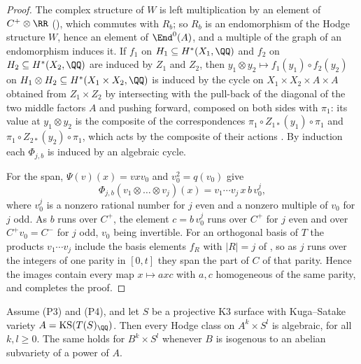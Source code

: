 \begin{proof}
The complex structure of $W$ is left multiplication by an element of
$C^{+}\otimes\RR$ (), which commutes with $R_{b}$; so $R_{b}$
is an endomorphism of the Hodge structure $W$, hence an element of
$\End^{0}(A)$, and a multiple of the graph of an endomorphism induces it.
If $f_{1}$ on $H_{1}\subseteq H^{*}(X_{1},\QQ)$ and $f_{2}$ on
$H_{2}\subseteq H^{*}(X_{2},\QQ)$ are induced by $Z_{1}$ and $Z_{2}$, then
$y_{1}\otimes y_{2}\mapsto f_{1}(y_{1})\circ f_{2}(y_{2})$ on
$H_{1}\otimes H_{2}\subseteq H^{*}(X_{1}\times X_{2},\QQ)$ is induced by the
cycle on $X_{1}\times X_{2}\times A\times A$ obtained from
$Z_{1}\times Z_{2}$ by intersecting with the pull-back of the diagonal of the
two middle factors $A$ and pushing forward, composed on both sides with
$\pi_{1}$: its value at $y_{1}\otimes y_{2}$ is the composite of the
correspondences $\pi_{1}\circ Z_{1*}(y_{1})\circ\pi_{1}$ and
$\pi_{1}\circ Z_{2*}(y_{2})\circ\pi_{1}$, which acts by the composite of their
actions \cite[\S16.1]{Ful98}. By induction each $\Phi_{j,b}$ is induced by
an algebraic cycle.

For the span, $\Psi(v)(x)=vxv_{0}$ and $v_{0}^{2}=q(v_{0})$ give
\[
  \Phi_{j,b}(v_{1}\otimes\dots\otimes v_{j})(x)=v_{1}\cdots v_{j}\,x\,b\,v_{0}^{j},
\]
where $v_{0}^{j}$ is a nonzero rational number for $j$ even and a nonzero
multiple of $v_{0}$ for $j$ odd. As $b$ runs over $C^{+}$, the element
$c=b\,v_{0}^{j}$ runs over $C^{+}$ for $j$ even and over $C^{+}v_{0}=C^{-}$
for $j$ odd, $v_{0}$ being invertible. For an orthogonal basis of $T$ the
products $v_{1}\cdots v_{j}$ include the basis elements $f_{R}$ with $|R|=j$
of , so as $j$ runs over the integers of one parity in
$[0,t]$ they span the part of $C$ of that parity. Hence the images contain
every map $x\mapsto axc$ with $a,c$ homogeneous of the same parity, and
 completes the proof.
\end{proof}

\begin{theorem}\label{thm:kspowers}
Assume \textup{(P3)} and \textup{(P4)}, and let $S$ be a projective K3
surface with Kuga--Satake variety $A=\mathrm{KS}(T(S)_{\QQ})$. Then every Hodge
class on $A^{k}\times S^{l}$ is algebraic, for all $k,l\ge0$. The same holds
for $B^{k}\times S^{l}$ whenever $B$ is isogenous to an abelian subvariety of
a power of $A$.
\end{theorem}

